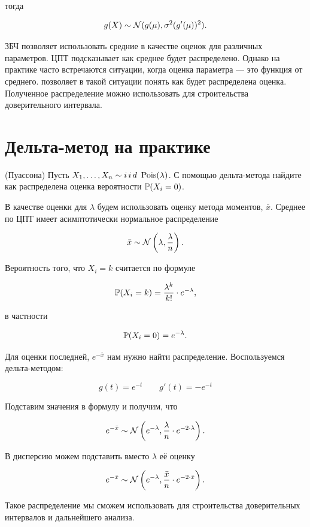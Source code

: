 \documentclass[12pt, a4paper, oneside]{article}
\begin{document}
тогда 

$$
g(X) \sim \mathcal{N}(g(\mu),\sigma^2 (g'(\mu))^2).
$$


ЗБЧ позволяет использовать средние в качестве оценок для различных параметров. ЦПТ подсказывает как среднее будет распределено. Однако на практике часто встречаются ситуации, когда оценка параметра --- это функция от среднего.   позволяет в такой ситуации понять как будет распределена оценка. Полученное распределение можно использовать для строительства доверительного интервала. 


\section*{Дельта-метод на практике}


\begin{problem}{(Пуассона)}
Пусть $X_1, \ldots, X_n \sim i\,i\,d\,\, \operatorname{Pois}(\lambda)$.   С помощью дельта-метода найдите как распределена оценка вероятности $\mathbb{P}(X_i = 0)$.
\end{problem} 

\begin{sol}
В качестве оценки для $\lambda$ будем использовать оценку метода моментов, $\bar{x}$.  Среднее по ЦПТ имеет асимптотически нормальное распределение

$$
\bar{x}\sim \mathcal{N} \left(\lambda, \frac{\lambda}{n} \right).
$$

Вероятность того, что $X_i = k$ считается по формуле 

$$
\mathbb{P}(X_i = k) = \frac{\lambda^k}{k!} \cdot e^{-\lambda},
$$ 

в частности 

$$
\mathbb{P}(X_i = 0) = e^{-\lambda}.
$$

Для оценки последней, $e^{-\bar{x}}$ нам нужно найти распределение. Воспользуемся  дельта-методом:

$$
g(t) = e^{-t} \qquad g'(t) = -e^{-t}
$$

Подставим значения в формулу и получим, что 

$$
e^{-\bar{x}} \sim \mathcal{N} \left( e^{-\lambda},  \frac{\lambda}{n} \cdot e^{-2 \cdot \lambda}  \right).
$$

В дисперсию можем подставить вместо $\lambda$ её оценку

$$
e^{-\bar{x}} \sim \mathcal{N} \left( e^{-\lambda},  \frac{\bar{x}}{n} \cdot e^{-2 \cdot \bar{x}}  \right).
$$

Такое распределение мы сможем использовать для строительства доверительных интервалов и дальнейшего анализа.
\end{sol}
\end{document}
